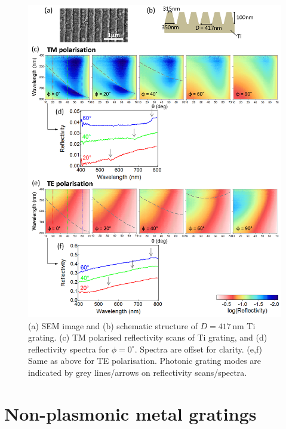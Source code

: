\begin{figure}[h!] 
\centering    
\includegraphics[width=\textwidth]{Fig4}
\caption[(a) SEM image and (b) schematic structure of $D=417$\,nm Ti grating. Reflectivity measurements of Ti grating in (c,d) TM and (e.f) TE polarisation.]{(a) SEM image and (b) schematic structure of $D=417$\,nm Ti grating. (c) TM polarised reflectivity scans of Ti grating, and (d) reflectivity spectra for $\phi=0^{\circ}$. Spectra are offset for clarity. (e,f) Same as above for TE polarisation. Photonic grating modes are indicated by grey lines/arrows on reflectivity scans/spectra.}
\label{7Fig4}
\end{figure}
\section{Non-plasmonic metal gratings}
